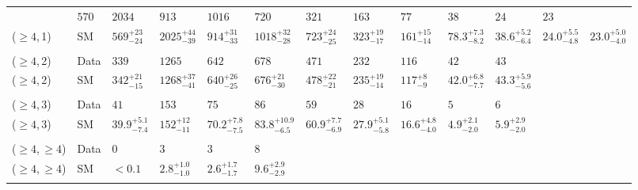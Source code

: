 \begin{table}[h!]
{\begin{tabular}{ lllllllllllll }
               & $570$
               & $2034$
               & $913$
               & $1016$
               & $720$
               & $321$
               & $163$
               & $77$
               & $38$
               & $24$
               & $23$                                          \\
               ($\geq4$,\,1)
               & SM
               & $569^{+23}_{-24}$
               & $2025^{+44}_{-39}$
               & $914^{+31}_{-33}$
               & $1018^{+32}_{-28}$
               & $723^{+24}_{-25}$
               & $323^{+19}_{-17}$
               & $161^{+15}_{-14}$
               & $78.3^{+7.3}_{-8.2}$
               & $38.6^{+5.2}_{-6.4}$
               & $24.0^{+5.5}_{-4.8}$
               & $23.0^{+5.0}_{-4.0}$                          \\\\[-2ex]
               ($\geq4$,\,2)
               & Data
               & $339$
               & $1265$
               & $642$
               & $678$
               & $471$
               & $232$
               & $116$
               & $42$
               & $43$                                          \\
               ($\geq4$,\,2)
               & SM
               & $342^{+21}_{-15}$
               & $1268^{+37}_{-41}$
               & $640^{+26}_{-25}$
               & $676^{+21}_{-30}$
               & $478^{+22}_{-21}$
               & $235^{+19}_{-14}$
               & $117^{+8}_{-9}$
               & $42.0^{+6.8}_{-7.7}$
               & $43.3^{+5.9}_{-5.6}$                          \\\\[-2ex]
               ($\geq4$,\,3)
               & Data
               & $41$
               & $153$
               & $75$
               & $86$
               & $59$
               & $28$
               & $16$
               & $5$
               & $6$                                           \\
               ($\geq4$,\,3)
               & SM
               & $39.9^{+5.1}_{-7.4}$
               & $152^{+12}_{-11}$
               & $70.2^{+7.8}_{-7.5}$
               & $83.8^{+10.9}_{-6.5}$
               & $60.9^{+7.7}_{-6.9}$
               & $27.9^{+5.1}_{-5.8}$
               & $16.6^{+4.8}_{-4.0}$
               & $4.9^{+2.1}_{-2.0}$
               & $5.9^{+2.9}_{-2.0}$                           \\\\[-2ex]
               ($\geq4$,\,$\geq4$)
               & Data
               & $0$
               & $3$
               & $3$
               & $8$                                           \\
               ($\geq4$,\,$\geq4$)
               & SM
               & $<0.1$ %
               & $2.8^{+1.0}_{-1.0}$
               & $2.6^{+1.7}_{-1.7}$
               & $9.6^{+2.9}_{-2.9}$                           \\\\[-3ex]
     \hline
   \end{tabular}
 }
\end{table}

